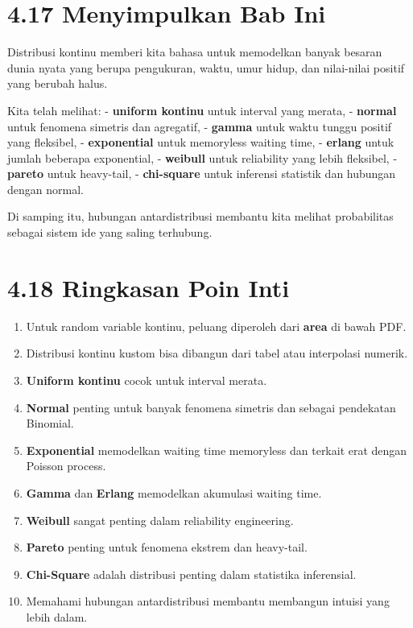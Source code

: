 \documentclass[
  letterpaper,
  DIV=11,
  numbers=noendperiod]{scrreprt}
\providecommand{\tightlist}{%
  \setlength{\itemsep}{0pt}\setlength{\parskip}{0pt}}
\begin{document}
\section{4.17 Menyimpulkan Bab Ini}\label{menyimpulkan-bab-ini-3}

Distribusi kontinu memberi kita bahasa untuk memodelkan banyak besaran
dunia nyata yang berupa pengukuran, waktu, umur hidup, dan nilai-nilai
positif yang berubah halus.

Kita telah melihat: - \textbf{uniform kontinu} untuk interval yang
merata, - \textbf{normal} untuk fenomena simetris dan agregatif, -
\textbf{gamma} untuk waktu tunggu positif yang fleksibel, -
\textbf{exponential} untuk memoryless waiting time, - \textbf{erlang}
untuk jumlah beberapa exponential, - \textbf{weibull} untuk reliability
yang lebih fleksibel, - \textbf{pareto} untuk heavy-tail, -
\textbf{chi-square} untuk inferensi statistik dan hubungan dengan
normal.

Di samping itu, hubungan antardistribusi membantu kita melihat
probabilitas sebagai sistem ide yang saling terhubung.

\section{4.18 Ringkasan Poin Inti}\label{ringkasan-poin-inti-3}

\begin{enumerate}
\def\labelenumi{\arabic{enumi}.}
\tightlist
\item
  Untuk random variable kontinu, peluang diperoleh dari \textbf{area} di
  bawah PDF.
\item
  Distribusi kontinu kustom bisa dibangun dari tabel atau interpolasi
  numerik.
\item
  \textbf{Uniform kontinu} cocok untuk interval merata.
\item
  \textbf{Normal} penting untuk banyak fenomena simetris dan sebagai
  pendekatan Binomial.
\item
  \textbf{Exponential} memodelkan waiting time memoryless dan terkait
  erat dengan Poisson process.
\item
  \textbf{Gamma} dan \textbf{Erlang} memodelkan akumulasi waiting time.
\item
  \textbf{Weibull} sangat penting dalam reliability engineering.
\item
  \textbf{Pareto} penting untuk fenomena ekstrem dan heavy-tail.
\item
  \textbf{Chi-Square} adalah distribusi penting dalam statistika
  inferensial.
\item
  Memahami hubungan antardistribusi membantu membangun intuisi yang
  lebih dalam.
\end{enumerate}
\end{document}
